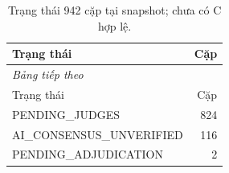\begingroup\small\setlength{\tabcolsep}{4pt}\renewcommand{\arraystretch}{1.16}
\begin{longtable}{p{.70\linewidth}r}
\caption{Trạng thái 942 cặp tại snapshot; chưa có C hợp lệ.}\label{tab:label-status}\\
\toprule Trạng thái & Cặp \\
\midrule\endfirsthead
\multicolumn{2}{l}{\textit{Bảng tiếp theo}}\\
\toprule Trạng thái & Cặp \\
\midrule\endhead
\bottomrule\endfoot
PENDING\_JUDGES & 824 \\
AI\_CONSENSUS\_UNVERIFIED & 116 \\
PENDING\_ADJUDICATION & 2 \\
\end{longtable}\endgroup
{}
